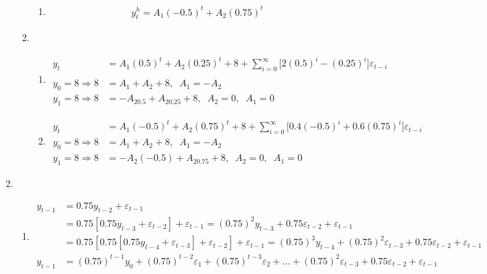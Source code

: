 \begin{enumerate}
\begin{enumerate}
\begin{enumerate}
					\item %
					\begin{align*}
						y_t^h=A_1(-0.5)^t+A_2(0.75)^t
					\end{align*}
					
				\end{enumerate}
				
				\item %
				\begin{enumerate}
					\item %
					\begin{align*}
					y_t&=A_1(0.5)^t+A_2(0.25)^t+8+\sum\limits_{i=0}^{\infty}\bigg[2(0.5)^i-(0.25)^i\bigg]\varepsilon_{t-i}\\
					\\
					y_0=8\Rightarrow8&=A_1+A_2+8,\;\;A_1=-A_2\\
					y_1=8\Rightarrow 8&=-A_20.5+A_20.25+8,\;\;A_2=0, \;\;A_1=0
					\end{align*}
					
					\item %
					\begin{align*}
					y_t&=A_1(-0.5)^t+A_2(0.75)^t+8+\sum\limits_{i=0}^{\infty}\Bigg[0.4(-0.5)^i+0.6(0.75)^i\Bigg]\varepsilon_{t-i}\\
					y_0=8\Rightarrow 8&=A_1+A_2+8,\;\; A_1=-A_2\\ 
					y_1=8\Rightarrow 8&=-A_2(-0.5)+A_20.75+8,\;\; A_2=0,\;\;A_1=0
					\end{align*}
					
				\end{enumerate}
				
		\end{enumerate}
		
	\item %
		\begin{enumerate}
			\item %
			\begin{align*}
				y_{t-1}&=0.75y_{t-2}+\varepsilon_{t-1}\\
				&=0.75[0.75y_{t-3}+\varepsilon_{t-2}]+\varepsilon_{t-1}=(0.75)^2y_{t-3}+0.75\varepsilon_{t-2}+\varepsilon_{t-1}\\
				&=0.75[0.75[0.75y_{t-4}+\varepsilon_{t-3}]+\varepsilon_{t-2}]+\varepsilon_{t-1}=(0.75)^3y_{t-4}+(0.75)^2\varepsilon_{t-3}+0.75\varepsilon_{t-2}+\varepsilon_{t-1}\\
				y_{t-1}&=(0.75)^{t-1}y_0+(0.75)^{t-2}\varepsilon_1+(0.75)^{t-3}\varepsilon_2+...+(0.75)^2\varepsilon_{t-3}+0.75\varepsilon_{t-2}+\varepsilon_{t-1}\\
		\end{align*}
		

\end{enumerate}
\end{enumerate}
